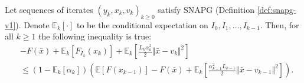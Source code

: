 \documentclass[12pt]{article}
\begin{document}
        \begin{theorem}
            Let sequences of iterates $(y_k, x_k, v_k)_{k \ge 0}$ satisfy SNAPG (Definition \ref{def:snapg-v1}). 
            Denote $\mathbb E_k [\cdot]$ to be the conditional expectation on $I_{0}, I_1, \ldots, I_{k - 1}$. 
            Then, for all $k \ge 1$ the following inequality is true: 
            $$
            \begin{aligned}
            & - F(\bar x) + 
            \mathbb E_k \left[
                F_{I_k}(x_k)
            \right]
            + \mathbb E_k
            \left[
                \frac{L_k\alpha_k^2}{2}\Vert \bar x - v_k\Vert^2
            \right]
            \\
            &\le (1 - \mathbb E_k [\alpha_k])
            \left(
                \mathbb E \left[F(x_{k - 1})\right]
                - 
                F(\bar x)
                + 
                \mathbb E_k 
                \left[\frac{\alpha_{k - 1}^2L_{k - 1}}{2}\Vert \bar x - v_{k - 1}\Vert^2\right]
            \right).
            \end{aligned}
            $$
        \end{theorem}
\end{document}
